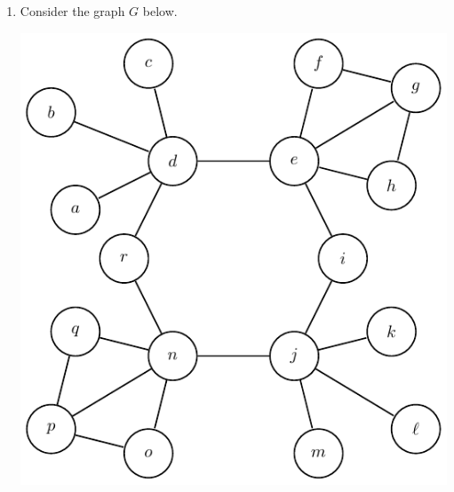 \documentclass[12pt]{article}
\begin{document}
\begin{enumerate}
\begin{enumerate}
\item Prove that for any $n$-vertex graph $G$, $\alpha(G) \geq \frac{n}{\Delta(G)+1}$.
\begin{proof}
	Let us consider the maximum independent set. The neighborhood of the independent set is the rest of the graph, which is also a vertex cover. The maximum size the neighborhood can be is if all vertices in the independent set had a max degree, so $\alpha(G)\Delta(G)$.
	\[\alpha(G)\Delta(G)\geq\beta(G) \iff \alpha(G)\Delta(G)\geq n-\alpha(G)  \iff \alpha(G)\Delta(G)+\alpha(G)\geq n\]\[\iff \alpha(G) \geq \frac{n}{\Delta(G)+1}\]
\end{proof}
\item Show that (b) is best possible by constructing for every pair of non-negative integers $r,s$ a graph $G$ with $\alpha(G) = r$, $\Delta(G) = s$, and $\alpha(G) = \frac{n}{\Delta(G)+1}$.\m
To do this, we will need $r=\frac{n}{\Delta(G)+1}\implies n=r(s+1)$. A simple trick will be to have $G$ have $r$ different connected components, with each component having a maximum independent set of size 1. Complete graph do such a thing. The size of those complete components will then need to be $s+1$ to satisfy the number of vertices condition and the $\Delta(G)$ condition. So then $r$ connected components of $K_{s+1}$ will satisfy the desired results.
\end{enumerate}
\medskip
\item Consider the graph $G$ below.
\begin{center}
\includegraphics[scale=1]{5_2.pdf}

\end{center}
\end{enumerate}
\end{document}
